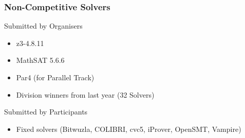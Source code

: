 \documentclass[table]{beamer}
\begin{document}
{
\begin{frame}
  \vspace*{-1pt}%
  \noindent{}
\end{frame}
}

{
\begin{frame}
  \vspace*{-1pt}%
  \noindent{}
\end{frame}
}

\begin{frame}
  \frametitle{Non-Competitive Solvers}

  Submitted by Organisers
  \begin{itemize}
  \item z3-4.8.11
  \item MathSAT 5.6.6
  \item Par4 (for Parallel Track)
  \item Division winners from last year (32 Solvers)
  \end{itemize}
  \bigskip

  Submitted by Participants
  \begin{itemize}
  \item Fixed solvers (Bitwuzla, COLIBRI, cvc5, iProver, OpenSMT, Vampire)
  \end{itemize}
\end{frame}
\end{document}

